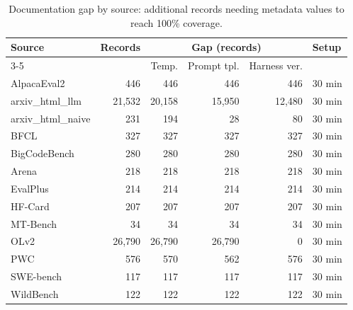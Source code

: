 \begin{table}[t]
\centering
\caption{Documentation gap by source: additional records needing metadata values to reach 100\% coverage.}
\label{tab:documentation_gap}
\small
\begin{tabular}{lrrrrl}
\toprule
Source & Records & \multicolumn{3}{c}{Gap (records)} & Setup \\
\cmidrule(lr){3-5}
 & & Temp. & Prompt tpl. & Harness ver. & \\
\midrule
AlpacaEval2 & 446 & 446 & 446 & 446 & 30 min \\
arxiv_html_llm & 21,532 & 20,158 & 15,950 & 12,480 & 30 min \\
arxiv_html_naive & 231 & 194 & 28 & 80 & 30 min \\
BFCL & 327 & 327 & 327 & 327 & 30 min \\
BigCodeBench & 280 & 280 & 280 & 280 & 30 min \\
Arena & 218 & 218 & 218 & 218 & 30 min \\
EvalPlus & 214 & 214 & 214 & 214 & 30 min \\
HF-Card & 207 & 207 & 207 & 207 & 30 min \\
MT-Bench & 34 & 34 & 34 & 34 & 30 min \\
OLv2 & 26,790 & 26,790 & 26,790 & 0 & 30 min \\
PWC & 576 & 570 & 562 & 576 & 30 min \\
SWE-bench & 117 & 117 & 117 & 117 & 30 min \\
WildBench & 122 & 122 & 122 & 122 & 30 min \\
\bottomrule
\end{tabular}
\end{table}